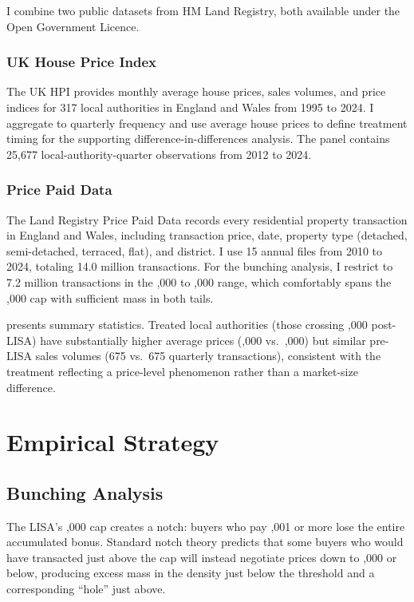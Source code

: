 \documentclass[12pt]{article}
\begin{document}
I combine two public datasets from HM Land Registry, both available under the Open Government Licence.

\subsubsection*{UK House Price Index} The UK HPI provides monthly average house prices, sales volumes, and price indices for 317 local authorities in England and Wales from 1995 to 2024. I aggregate to quarterly frequency and use average house prices to define treatment timing for the supporting difference-in-differences analysis. The panel contains 25,677 local-authority-quarter observations from 2012 to 2024.

\subsubsection*{Price Paid Data} The Land Registry Price Paid Data records every residential property transaction in England and Wales, including transaction price, date, property type (detached, semi-detached, terraced, flat), and district. I use 15 annual files from 2010 to 2024, totaling 14.0 million transactions. For the bunching analysis, I restrict to 7.2 million transactions in the ,000 to ,000 range, which comfortably spans the ,000 cap with sufficient mass in both tails.



 presents summary statistics. Treated local authorities (those crossing ,000 post-LISA) have substantially higher average prices (,000 vs.\ ,000) but similar pre-LISA sales volumes (675 vs.\ 675 quarterly transactions), consistent with the treatment reflecting a price-level phenomenon rather than a market-size difference.

\section{Empirical Strategy}

\subsection{Bunching Analysis}

The LISA's ,000 cap creates a notch: buyers who pay ,001 or more lose the entire accumulated bonus. Standard notch theory \citep{kleven2016} predicts that some buyers who would have transacted just above the cap will instead negotiate prices down to ,000 or below, producing excess mass in the density just below the threshold and a corresponding ``hole'' just above.
\end{document}
